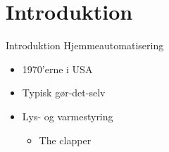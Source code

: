 \section{Introduktion}
\begin{frame}{Introduktion}{}
Hjemmeautomatisering
\begin{itemize}
	\item 1970'erne i USA
	\item Typisk gør-det-selv
	\item Lys- og varmestyring
	\begin{itemize}
		\item The clapper
	\end{itemize}
\end{itemize}
\end{frame}